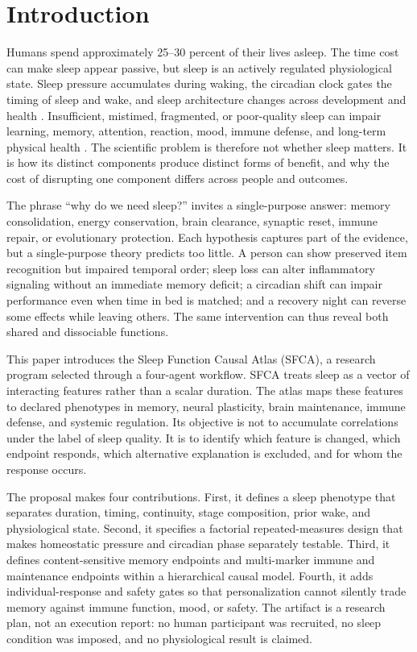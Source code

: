 \documentclass[conference]{IEEEtran}
\begin{document}
\section{Introduction}
Humans spend approximately 25--30 percent of their lives asleep. The time cost can make sleep appear passive, but sleep is an actively regulated physiological state. Sleep pressure accumulates during waking, the circadian clock gates the timing of sleep and wake, and sleep architecture changes across development and health \cite{BorbeLy1982,NHLBI2022}. Insufficient, mistimed, fragmented, or poor-quality sleep can impair learning, memory, attention, reaction, mood, immune defense, and long-term physical health \cite{NHLBI2022}. The scientific problem is therefore not whether sleep matters. It is how its distinct components produce distinct forms of benefit, and why the cost of disrupting one component differs across people and outcomes.

The phrase ``why do we need sleep?'' invites a single-purpose answer: memory consolidation, energy conservation, brain clearance, synaptic reset, immune repair, or evolutionary protection. Each hypothesis captures part of the evidence, but a single-purpose theory predicts too little. A person can show preserved item recognition but impaired temporal order; sleep loss can alter inflammatory signaling without an immediate memory deficit; a circadian shift can impair performance even when time in bed is matched; and a recovery night can reverse some effects while leaving others. The same intervention can thus reveal both shared and dissociable functions.

This paper introduces the Sleep Function Causal Atlas (SFCA), a research program selected through a four-agent workflow. SFCA treats sleep as a vector of interacting features rather than a scalar duration. The atlas maps these features to declared phenotypes in memory, neural plasticity, brain maintenance, immune defense, and systemic regulation. Its objective is not to accumulate correlations under the label of sleep quality. It is to identify which feature is changed, which endpoint responds, which alternative explanation is excluded, and for whom the response occurs.

The proposal makes four contributions. First, it defines a sleep phenotype that separates duration, timing, continuity, stage composition, prior wake, and physiological state. Second, it specifies a factorial repeated-measures design that makes homeostatic pressure and circadian phase separately testable. Third, it defines content-sensitive memory endpoints and multi-marker immune and maintenance endpoints within a hierarchical causal model. Fourth, it adds individual-response and safety gates so that personalization cannot silently trade memory against immune function, mood, or safety. The artifact is a research plan, not an execution report: no human participant was recruited, no sleep condition was imposed, and no physiological result is claimed.
\end{document}
